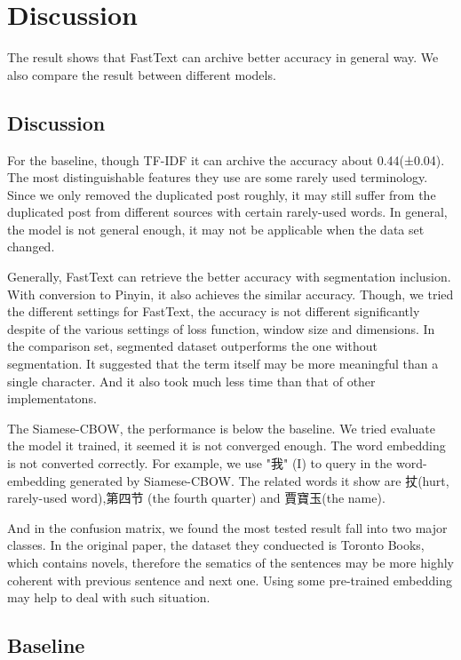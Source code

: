\chapter{Discussion}

The result shows that FastText can archive better accuracy in general way. We also compare the result between different models.

\section{Discussion}


For the baseline, though TF-IDF it can archive the accuracy about 0.44(±0.04). 
The most distinguishable features they use are some rarely used terminology. 
Since we only removed the duplicated post roughly, it may still suffer from the duplicated post from different sources with certain rarely-used words. 
In general, the model is not general enough, it may not be applicable when the data set changed. 

Generally, FastText can retrieve the better accuracy with segmentation inclusion. 
With conversion to Pinyin, it also achieves the similar accuracy. Though, we tried the different settings for FastText,
the accuracy is not different significantly despite of the various settings of loss function, window size and dimensions. 
In the comparison set, segmented dataset outperforms the one without segmentation. 
It suggested that the term itself may be more meaningful than a single character. And it also took much less time than that of other implementatons.

The Siamese-CBOW, the performance is below the baseline. We tried evaluate the model it trained, it seemed it is not converged enough. 
The word embedding is not converted correctly. For example, we use "我" (I) to query in the word-embedding generated by Siamese-CBOW. 
The related words it show are 扙(hurt, rarely-used word),第四节 (the fourth quarter) and 賈寶玉(the name).

And in the confusion matrix, we found the most tested result fall into two major classes.
In the original paper, the dataset they conduected is Toronto Books, which contains novels,
 therefore the sematics of the sentences may be more highly coherent with previous sentence and next one. Using some pre-trained embedding may help to deal with such situation. 

\section{Baseline}

